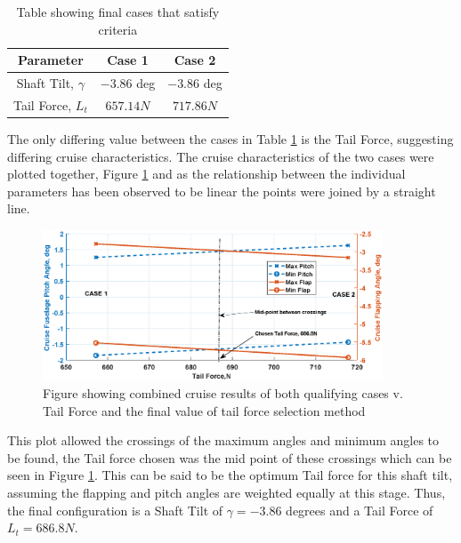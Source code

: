 \documentclass[11pt,a4paper]{article}
\begin{document}
\begin{table}[H]
\centering 
    \caption{Table showing final cases that satisfy criteria}
\begin{tabular}{ccc}
\hline
  \rowcolor[HTML]{DAE8FC} 
  Parameter & Case 1 & Case 2\\ \hline
   Shaft Tilt, $\gamma$ & $-3.86$ deg & $-3.86$ deg\\
   Tail Force, $L_t$ & $657.14N$ & $717.86N$\\
   \hline
\end{tabular}{}
    \label{tab:long}
\end{table}{}

The only differing value between the cases in Table \ref{tab:long} is the Tail Force, suggesting differing cruise characteristics. The cruise characteristics of the two cases were plotted together, Figure \ref{fig:cases} and as the relationship between the individual parameters has been observed to be linear the points were joined by a straight line.
\begin{figure}[H]
    \centering
    \includegraphics[width=0.9\textwidth]{cases.eps}
    \caption{Figure showing combined cruise results of both qualifying cases v. Tail Force and the final value of tail force selection method}
    \label{fig:cases}
\end{figure}{}

This plot allowed the crossings of the maximum angles and minimum angles to be found, the Tail force chosen was the mid point of these crossings which can be seen in Figure \ref{fig:cases}. This can be said to be the optimum Tail force for this shaft tilt, assuming the flapping and pitch angles are weighted equally at this stage. Thus, the final configuration is a Shaft Tilt of $\gamma=-3.86$ degrees and a Tail Force of $L_t=686.8N$.
\end{document}
